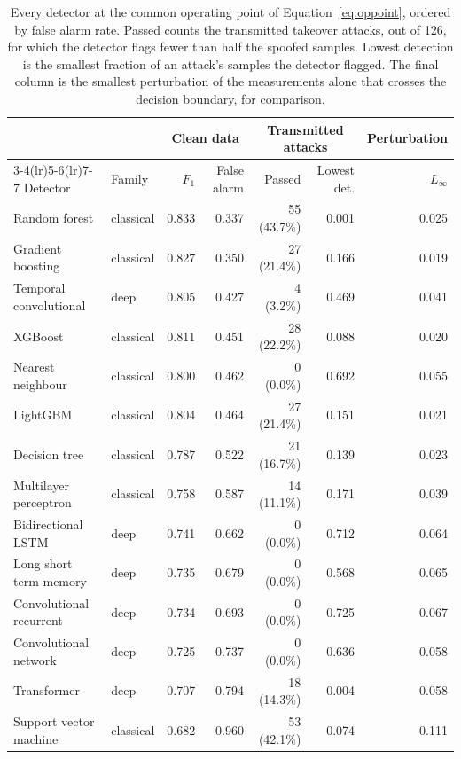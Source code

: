 \documentclass[pdflatex,sn-basic]{sn-jnl}
\theoremstyle{thmstyleone}
\theoremstyle{thmstyletwo}
\theoremstyle{thmstylethree}
\begin{document}
\begin{table}[t]
\centering
\caption{Every detector at the common operating point of Equation~\ref{eq:oppoint},
ordered by false alarm rate. Passed counts the transmitted takeover attacks, out of
126, for which the detector flags fewer than half the spoofed samples. Lowest detection
is the smallest fraction of an attack's samples the detector flagged. The final column
is the smallest perturbation of the measurements alone that crosses the decision
boundary, for comparison.}
\label{tab:main}
\footnotesize
\begin{tabular}{@{}llrrrrr@{}}
\toprule
 & & \multicolumn{2}{c}{Clean data} & \multicolumn{2}{c}{Transmitted attacks}
 & Perturbation \\
\cmidrule(lr){3-4}\cmidrule(lr){5-6}\cmidrule(lr){7-7}
Detector & Family & $F_1$ & False alarm & Passed & Lowest det.
 & $L_\infty$ \\
\midrule
Random forest & classical & 0.833 & 0.337 & 55 (43.7\%) & 0.001 & 0.025 \\
Gradient boosting & classical & 0.827 & 0.350 & 27 (21.4\%) & 0.166 & 0.019 \\
Temporal convolutional & deep & 0.805 & 0.427 & 4 (3.2\%) & 0.469 & 0.041 \\
XGBoost & classical & 0.811 & 0.451 & 28 (22.2\%) & 0.088 & 0.020 \\
Nearest neighbour & classical & 0.800 & 0.462 & 0 (0.0\%) & 0.692 & 0.055 \\
LightGBM & classical & 0.804 & 0.464 & 27 (21.4\%) & 0.151 & 0.021 \\
Decision tree & classical & 0.787 & 0.522 & 21 (16.7\%) & 0.139 & 0.023 \\
Multilayer perceptron & classical & 0.758 & 0.587 & 14 (11.1\%) & 0.171 & 0.039 \\
Bidirectional LSTM & deep & 0.741 & 0.662 & 0 (0.0\%) & 0.712 & 0.064 \\
Long short term memory & deep & 0.735 & 0.679 & 0 (0.0\%) & 0.568 & 0.065 \\
Convolutional recurrent & deep & 0.734 & 0.693 & 0 (0.0\%) & 0.725 & 0.067 \\
Convolutional network & deep & 0.725 & 0.737 & 0 (0.0\%) & 0.636 & 0.058 \\
Transformer & deep & 0.707 & 0.794 & 18 (14.3\%) & 0.004 & 0.058 \\
Support vector machine & classical & 0.682 & 0.960 & 53 (42.1\%) & 0.074 & 0.111 \\
\bottomrule
\end{tabular}
\end{table}
\end{document}
